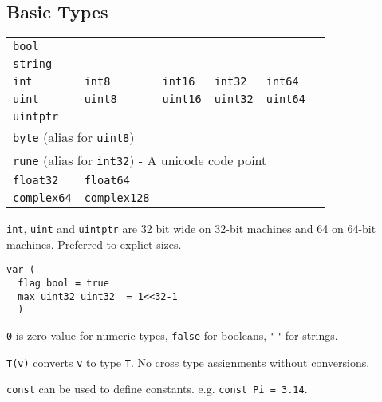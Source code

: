 \subsection{Basic Types}
\begin{tabular}{l l l l l l}
\multicolumn{6}{l}{\texttt{bool}} \\
\multicolumn{6}{l}{\texttt{string}} \\
\texttt{int} & \texttt{int8} & \texttt{int16} & \texttt{int32} & \texttt{int64} \\
\texttt{uint} & \texttt{uint8} & \texttt{uint16} & \texttt{uint32} & \texttt{uint64} \\
\multicolumn{6}{l}{\texttt{uintptr}} \\
\multicolumn{6}{l}{\texttt{byte} (alias for \texttt{uint8})} \\
\multicolumn{6}{l}{\texttt{rune} (alias for \texttt{int32}) - A unicode code point} \\
\texttt{float32} & \texttt{float64} \\
\texttt{complex64} & \texttt{complex128} \\
\end{tabular}

\texttt{int}, \texttt{uint} and \texttt{uintptr} are 32 bit wide on 32-bit machines and 64 on 64-bit machines. Preferred to explict sizes.

\begin{lstlisting}
var (
  flag bool = true
  max_uint32 uint32  = 1<<32-1 
  )
\end{lstlisting}

\texttt{0} is zero value for numeric types, \texttt{false} for booleans, \texttt{""} for strings.

\texttt{T(v)} converts \texttt{v} to type \texttt{T}. No cross type assignments without conversions.

\texttt{const} can be used to define constants. e.g. \texttt{const Pi = 3.14}.

